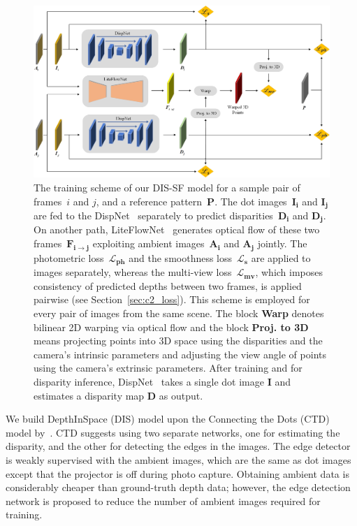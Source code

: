 \begin{figure}[t]
    \begin{center}
        \includegraphics[width=1.0\linewidth]{images/chapter2/figures/Fig1.jpg}
    \end{center}
   \caption{The training scheme of our DIS-SF model for a sample pair of frames~$i$ and $j$, and a reference pattern~$\boldsymbol{P}$. The dot images~$\boldsymbol{I_i}$ and $\boldsymbol{I_j}$ are fed to the DispNet~\citep{mayer2016large} separately to predict disparities~$\boldsymbol{D_i}$ and $\boldsymbol{D_j}$. On another path, LiteFlowNet~\citep{hui2018liteflownet} generates optical flow of these two frames~$\boldsymbol{F_{i \rightarrow j}}$ exploiting ambient images~$\boldsymbol{A_i}$ and $\boldsymbol{A_j}$ jointly. The photometric loss~$\boldsymbol{\mathcal{L}_{ph}}$ and the smoothness loss~$\boldsymbol{\mathcal{L}_s}$ are applied to images separately, whereas the multi-view loss~$\boldsymbol{\mathcal{L}_{mv}}$, which imposes consistency of predicted depths between two frames, is applied pairwise (see Section~\ref{sec:c2_loss}). This scheme is employed for every pair of images from the same scene. The block \textbf{Warp} denotes bilinear 2D warping via optical flow and the block \textbf{Proj. to 3D} means projecting points into 3D space using the disparities and the camera's intrinsic parameters and adjusting the view angle of points using the camera's extrinsic parameters. After training and for disparity inference, DispNet~\citep{mayer2016large} takes a single dot image $\boldsymbol{I}$ and estimates a disparity map $\boldsymbol{D}$ as output.}
    \label{fig:c2_single}
\end{figure}

We build DepthInSpace (DIS) model upon the Connecting the Dots (CTD) model by~\cite{riegler2019connecting}. CTD suggests using two separate networks, one for estimating the disparity, and the other for detecting the edges in the images. The edge detector is weakly supervised with the ambient images, which are the same as dot images except that the projector is off during photo capture. Obtaining ambient data is considerably cheaper than ground-truth depth data; however, the edge detection network is proposed to reduce the number of ambient images required for training.


